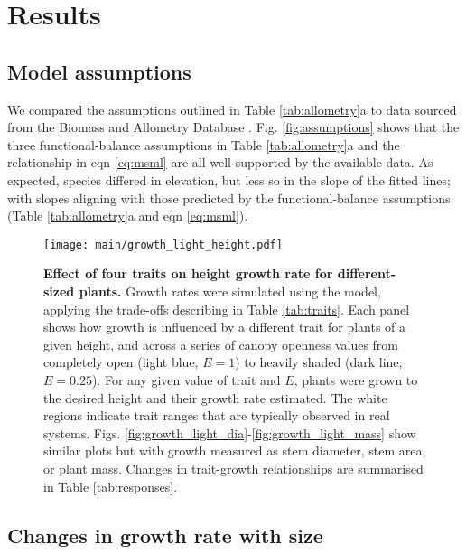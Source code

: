 \documentclass[9pt,twocolumn,twoside,lineno]{pnas-new}
\begin{document}
\section*{Results}

\subsection{Model assumptions}

We compared the assumptions outlined in Table \ref{tab:allometry}a to data sourced from the Biomass and Allometry Database \citep[\textsc{baad}][]{Falster-2015b}. Fig. \ref{fig:assumptions} shows that the three functional-balance assumptions in Table \ref{tab:allometry}a and the relationship in eqn \ref{eq:msml} are all well-supported by the available data. As expected, species differed in elevation, but less so in the slope of the fitted lines; with slopes aligning with those predicted by the functional-balance assumptions (Table \ref{tab:allometry}a and eqn \ref{eq:msml}).

\begin{SCfigure*}[\sidecaptionrelwidth][!ht]
\centering
\texttt{[image: main/growth\_light\_height.pdf]}
\caption{\textbf{Effect of four traits on height growth rate for different-sized plants.}
Growth rates were simulated using the {\plant} model, applying the trade-offs describing in Table \ref{tab:traits}. Each panel shows how growth is influenced by a different trait for plants of a given height, and across a series of canopy openness values from completely open (light blue,  $E=1$) to heavily shaded (dark line, $E=0.25$). For any given value of trait and $E$, plants were grown to the desired height and their growth rate estimated. The white regions indicate trait ranges that are typically observed in real systems. Figs. \ref{fig:growth_light_dia}-\ref{fig:growth_light_mass} show similar plots but with growth measured as stem diameter, stem area, or plant mass. Changes in trait-growth relationships are summarised in Table \ref{tab:responses}.
\label{fig:growth_light_height}}
\end{SCfigure*}

\subsection{Changes in growth rate with size}
\end{document}
